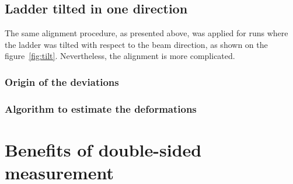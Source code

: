       \begin{figure}
      \end{figure}



    \subsection{Ladder tilted in one direction}

      The same alignment procedure, as presented above, was applied for runs where the ladder was tilted with respect to the beam direction, as shown on the figure~\ref{fig:tilt}.
      Nevertheless, the alignment is more complicated.
      
      \begin{figure}
      \end{figure}
    
      \subsubsection{Origin of the deviations}

      \begin{figure}
      \end{figure}

      \subsubsection{Algorithm to estimate the deformations}

      \begin{figure}
      \end{figure}
    
  \section{Benefits of double-sided measurement}

